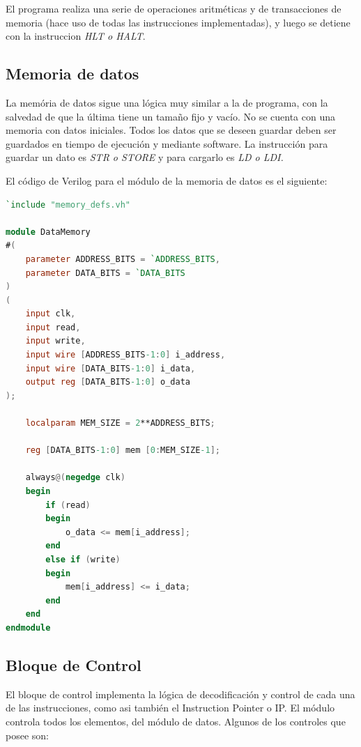 \documentclass{article}
\begin{document}
El programa realiza una serie de operaciones aritméticas y de transacciones de memoria
(hace uso de todas las instrucciones implementadas), y luego se detiene con la instruccion \textit{HLT o HALT}.

\newpage

\subsection{Memoria de datos}

La memória de datos sigue una lógica muy similar a la de programa, con la salvedad de que la última tiene
un tamaño fijo y vacío. No se cuenta con una memoria con datos iniciales. Todos los datos que se deseen
guardar deben ser guardados en tiempo de ejecución y mediante software. La instrucción para guardar un dato
es \textit{STR o STORE} y para cargarlo es \textit{LD o LDI.}

El código de Verilog para el módulo de la memoria de datos es el siguiente:

\begin{shaded}
\begin{lstlisting}[language=Verilog]
`include "memory_defs.vh"

module DataMemory
#(
    parameter ADDRESS_BITS = `ADDRESS_BITS,
    parameter DATA_BITS = `DATA_BITS
)
(
    input clk,
    input read,
    input write,
    input wire [ADDRESS_BITS-1:0] i_address,
    input wire [DATA_BITS-1:0] i_data,
    output reg [DATA_BITS-1:0] o_data
);

    localparam MEM_SIZE = 2**ADDRESS_BITS;

    reg [DATA_BITS-1:0] mem [0:MEM_SIZE-1];

    always@(negedge clk)
    begin
        if (read)
        begin
            o_data <= mem[i_address];
        end
        else if (write)
        begin
            mem[i_address] <= i_data;
        end
    end
endmodule
\end{lstlisting}
\end{shaded}

\newpage

\subsection{Bloque de Control}

El bloque de control implementa la lógica de decodificación y control de cada una de las instrucciones,
como asi también el Instruction Pointer o IP. El módulo controla todos los elementos, del módulo de datos.
Algunos de los controles que posee son:
\end{document}
